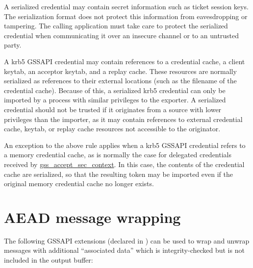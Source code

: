 \documentclass[letterpaper,10pt,english]{sphinxmanual}
\begin{document}
A serialized credential may contain secret information such as ticket
session keys.  The serialization format does not protect this
information from eavesdropping or tampering.  The calling application
must take care to protect the serialized credential when communicating
it over an insecure channel or to an untrusted party.

A krb5 GSSAPI credential may contain references to a credential cache,
a client keytab, an acceptor keytab, and a replay cache.  These
resources are normally serialized as references to their external
locations (such as the filename of the credential cache).  Because of
this, a serialized krb5 credential can only be imported by a process
with similar privileges to the exporter.  A serialized credential
should not be trusted if it originates from a source with lower
privileges than the importer, as it may contain references to external
credential cache, keytab, or replay cache resources not accessible to
the originator.

An exception to the above rule applies when a krb5 GSSAPI credential
refers to a memory credential cache, as is normally the case for
delegated credentials received by \href{http://tools.ietf.org/html/rfc2744.html\#section-5.1}{gss\_accept\_sec\_context}.  In this
case, the contents of the credential cache are serialized, so that the
resulting token may be imported even if the original memory credential
cache no longer exists.


\section{AEAD message wrapping}
\label{appdev/gssapi:aead-message-wrapping}
The following GSSAPI extensions (declared in
) can be used to wrap and unwrap messages
with additional ``associated data'' which is integrity-checked but is
not included in the output buffer:
\end{document}
